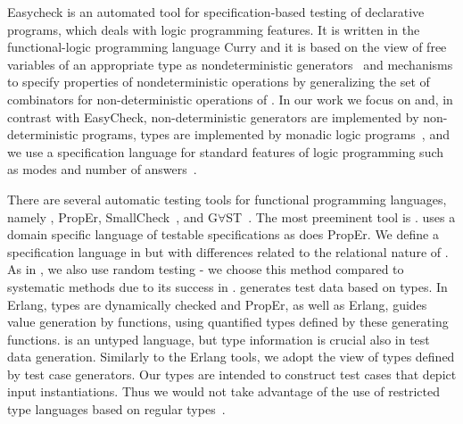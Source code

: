 {\sf Easycheck} is an automated tool for specification-based testing of
declarative programs, which deals with logic programming features.
%
It is written in the functional-logic programming language Curry and it
is based on the view of free variables of an appropriate type as
nondeterministic generators~\cite{antoy2006overlapping} and mechanisms
to specify  properties of
nondeterministic operations by generalizing the set of combinators for
non-deterministic operations of \QuickCheck{}.
%
In our work we focus on \Prolog{} and, in contrast with {\sf EasyCheck}, non-deterministic generators are implemented by non-deterministic \Prolog{}
programs, types are implemented by monadic logic programs~\cite{fruhwirth1991logic,florido1992types}, and
we use a specification language for standard features of
logic programming such as modes and number of
answers~\cite{Deville1990logprog}.
%


There are several automatic testing tools for functional programming
languages, namely \QuickCheck, {\sf PropEr}, {\sf SmallCheck}~\cite{runciman2008smallcheck},
and G$\forall$ST~\cite{koopman2003gast}.
The %
most preeminent tool is \QuickCheck{}.
%
\QuickCheck{} uses a domain specific language of testable specifications
as does {\sf PropEr}.
%
We define a specification language in \plqc{} but with
differences related to the relational nature of \Prolog{}. %
As in \QuickCheck{}, we also use random testing - we choose this method
compared to systematic methods due to its success in \QuickCheck{}.
%
\QuickCheck{} generates test data %
based
on \Haskell{} types.
In {\sf Erlang}, types are dynamically checked and {\sf PropEr}, as well
as {\sf Erlang}\QuickCheck{}, guides value generation by functions,
using quantified types defined by these generating functions.
%
\Prolog{} is an untyped language, but type information is crucial also in
\plqc{} test data generation.
%
Similarly to the {\sf Erlang} tools, we adopt the view of types defined
by test case generators.
%
Our types are intended to construct test cases that depict input
instantiations.
%
Thus we would not take advantage of the use of restricted type languages
based on regular types~\cite{Yardeni:1991:TSL:110703.110705,fruhwirth1991logic,DBLP:conf/iclp/Zobel87,florido1992types}.


